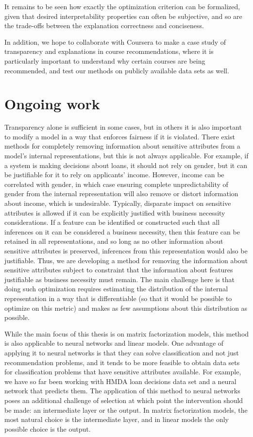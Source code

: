 It remains to be seen how exactly the optimization criterion can be formalized,
given that desired interpretability properties can often be subjective, and so
are the trade-offs between the explanation correctness and conciseness.

In addition, we hope to collaborate with Coursera to make a case study of
transparency and explanations in course recommendations, where it is
particularly important to understand why certain courses are being recommended,
and test our methods on publicly available data sets as well.

\section{Ongoing work}

Transparency alone is sufficient in some cases, but in others it is also
important to modify a model in a way that enforces fairness if it is violated.
There exist methods for completely removing information about sensitive
attributes from a model's internal representations\cite{Beutel2017DataDA}, but
this is not always applicable. For example, if a system is making decisions
about loans, it should not rely on gender, but it can be justifiable for it to
rely on applicants' income. However, income can be correlated with gender, in
which case ensuring complete unpredictability of gender from the internal
representation will also remove or distort information about income, which is
undesirable. Typically, disparate impact on sensitive attributes is allowed if it
can be explicitly justified with business necessity considerations. If a feature
can be identified or constructed such that all inferences on it can be considered
a business necessity, then this feature can be retained in all representations,
and so long as no other information about sensitive attributes is preserved, 
inferences from this representation would also be justifiable.
Thus, we are developing a method for removing the information
about sensitive attributes subject to constraint that the information about
features justifiable as business necessity must remain. The main challenge here
is that doing such optimization requires estimating the distribution of the
internal representation in a way that is differentiable (so that it would be
possible to optimize on this metric) and makes as few assumptions about this
distribution as possible.

While the main focus of this thesis is on matrix factorization models, this
method is also applicable to neural networks and linear models. One advantage of
applying it to neural networks is that they can solve classification and not
just recommendation problems, and it tends to be more feasible to obtain data
sets for classification problems that have sensitive attributes available. For
example, we have so far been working with HMDA loan decisions data set and a
neural network that predicts them. The application of this method to neural
networks poses an additional challenge of selection at which point the
intervention should be made: an intermediate layer or the output. In matrix
factorization models, the most natural choice is the intermediate layer, and in
linear models the only possible choice is the output.

